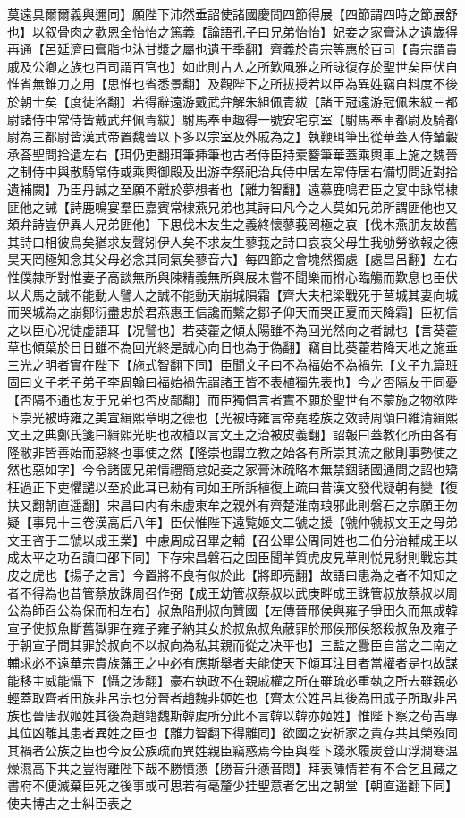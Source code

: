 莫遠具爾爾義與邇同】願陛下沛然垂詔使諸國慶問四節得展【四節謂四時之節展舒也】以叙骨肉之歡恩全怡怡之篤義【論語孔子曰兄弟怡怡】妃妾之家膏沐之遺歲得再通【呂延濟曰膏脂也沐甘漿之屬也遺于季翻】齊義於貴宗等惠於百司【貴宗謂貴戚及公卿之族也百司謂百官也】如此則古人之所歎風雅之所詠復存於聖世矣臣伏自惟省無錐刀之用【思惟也省悉景翻】及觀陛下之所拔授若以臣為異姓竊自料度不後於朝士矣【度徒洛翻】若得辭遠游戴武弁解朱組佩青紱【諸王冠遠游冠佩朱紱三都尉諸侍中常侍皆戴武弁佩青紱】駙馬奉車趣得一號安宅京室【駙馬奉車都尉及騎都尉為三都尉皆漢武帝置魏晉以下多以宗室及外戚為之】執鞭珥筆出從華蓋入侍輦轂承荅聖問拾遺左右【珥仍吏翻珥筆挿筆也古者侍臣持槖簪筆華蓋乘輿車上施之魏晉之制侍中與散騎常侍或乘輿御殿及出游幸祭祀治兵侍中居左常侍居右備切問近對拾遺補闕】乃臣丹誠之至願不離於夢想者也【離力智翻】遠慕鹿鳴君臣之宴中詠常棣匪他之誡【詩鹿鳴宴羣臣嘉賓常棣燕兄弟也其詩曰凡今之人莫如兄弟所謂匪他也又頍弁詩豈伊異人兄弟匪他】下思伐木友生之義終懷蓼莪罔極之哀【伐木燕朋友故舊其詩曰相彼鳥矣猶求友聲矧伊人矣不求友生蓼莪之詩曰哀哀父母生我劬勞欲報之德昊天罔極知念其父母必念其同氣矣蓼音六】每四節之會塊然獨處【處昌呂翻】左右惟僕隸所對惟妻子高談無所與陳精義無所與展未嘗不聞樂而拊心臨觴而歎息也臣伏以犬馬之誠不能動人譬人之誠不能動天崩城隕霜【齊大夫杞梁戰死于莒城其妻向城而哭城為之崩鄒衍盡忠於君燕惠王信讒而繫之鄒子仰天而哭正夏而天降霜】臣初信之以臣心况徒虚語耳【况譬也】若葵藿之傾太陽雖不為回光然向之者誠也【言葵藿草也傾葉於日日雖不為回光終是誠心向日也為于偽翻】竊自比葵藿若降天地之施垂三光之明者實在陛下【施式智翻下同】臣聞文子曰不為福始不為禍先【文子九篇班固曰文子老子弟子李周翰曰福始禍先謂諸王皆不表植獨先表也】今之否隔友于同憂【否隔不通也友于兄弟也否皮鄙翻】而臣獨倡言者實不願於聖世有不蒙施之物欲陛下崇光被時雍之美宣緝熙章明之德也【光被時雍言帝堯睦族之效詩周頌曰維清緝熙文王之典鄭氏箋曰緝熙光明也故植以言文王之治被皮義翻】詔報曰蓋教化所由各有隆敝非皆善始而惡終也事使之然【隆崇也謂立教之始各有所崇其流之敝則事勢使之然也惡如字】今令諸國兄弟情禮簡怠妃妾之家膏沐疏略本無禁錮諸國通問之詔也矯枉過正下吏懼譴以至於此耳已勑有司如王所訴植復上疏曰昔漢文發代疑朝有變【復扶又翻朝直遥翻】宋昌曰内有朱虚東牟之親外有齊楚淮南琅邪此則磐石之宗願王勿疑【事見十三卷漢高后八年】臣伏惟陛下遠覧姬文二虢之援【虢仲虢叔文王之母弟文王咨于二虢以成王業】中慮周成召畢之輔【召公畢公周同姓也二伯分治輔成王以成太平之功召讀曰邵下同】下存宋昌磐石之固臣聞羊質虎皮見草則悦見豺則戰忘其皮之虎也【揚子之言】今置將不良有似於此【將即亮翻】故語曰患為之者不知知之者不得為也昔管蔡放誅周召作弼【成王幼管叔蔡叔以武庚畔成王誅管叔放蔡叔以周公為師召公為保而相左右】叔魚陷刑叔向贊國【左傳晉邢侯與雍子爭田久而無成韓宣子使叔魚斷舊獄罪在雍子雍子納其女於叔魚叔魚蔽罪於邢侯邢侯怒殺叔魚及雍子于朝宣子問其罪於叔向不以叔向為私其親而從之决平也】三監之釁臣自當之二南之輔求必不遠華宗貴族藩王之中必有應斯舉者夫能使天下傾耳注目者當權者是也故謀能移主威能懾下【懾之涉翻】豪右執政不在親戚權之所在雖疏必重埶之所去雖親必輕蓋取齊者田族非呂宗也分晉者趙魏非姬姓也【齊太公姓呂其後為田成子所取非呂族也晉唐叔姬姓其後為趙籍魏斯韓䖍所分此不言韓以韓亦姬姓】惟陛下察之苟吉專其位凶離其患者異姓之臣也【離力智翻下得離同】欲國之安祈家之貴存共其榮歿同其禍者公族之臣也今反公族疏而異姓親臣竊惑焉今臣與陛下踐氷履炭登山浮澗寒温燥濕高下共之豈得離陛下哉不勝憤懣【勝音升懣音悶】拜表陳情若有不合乞且藏之書府不便滅棄臣死之後事或可思若有毫釐少挂聖意者乞出之朝堂【朝直遥翻下同】使夫博古之士糾臣表之